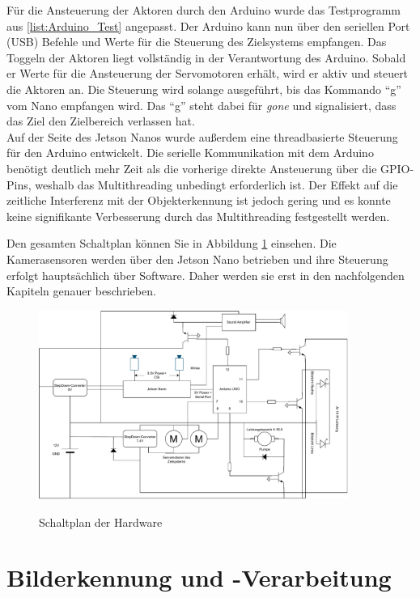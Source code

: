 Für die Ansteuerung der Aktoren durch den Arduino wurde das Testprogramm aus \ref{list:Arduino_Test} angepasst. Der Arduino kann nun über den seriellen Port (USB) Befehle und Werte für die Steuerung des Zielsystems empfangen. Das Toggeln der Aktoren liegt vollständig in der Verantwortung des Arduino. Sobald er Werte für die Ansteuerung der Servomotoren erhält, wird er aktiv und steuert die Aktoren an. Die Steuerung wird solange ausgeführt, bis das Kommando "`g"' vom Nano empfangen wird. Das "`g"' steht dabei für \textit{gone} und signalisiert, dass das Ziel den Zielbereich verlassen hat.
\\
Auf der Seite des Jetson Nanos wurde außerdem eine threadbasierte Steuerung für den Arduino entwickelt. Die serielle Kommunikation mit dem Arduino benötigt deutlich mehr Zeit als die vorherige direkte Ansteuerung über die \ac{GPIO}-Pins, weshalb das Multithreading unbedingt erforderlich ist. Der Effekt auf die zeitliche Interferenz mit der Objekterkennung ist jedoch gering und es konnte keine signifikante Verbesserung durch das Multithreading festgestellt werden.

Den gesamten Schaltplan können Sie in Abbildung \ref{diag:all} einsehen. Die Kamerasensoren werden über den Jetson Nano betrieben und ihre Steuerung erfolgt hauptsächlich über Software. Daher werden sie erst in den nachfolgenden Kapiteln genauer beschrieben.

\begin{figure}[h]
    \centering
    \includegraphics[angle=90,width=0.9\textwidth]{images/Schaltskizzen-Seite-3.drawio.pdf}
    \label{diag:all}
    \caption{Schaltplan der Hardware}
\end{figure}

\section{Bilderkennung und -Verarbeitung}

